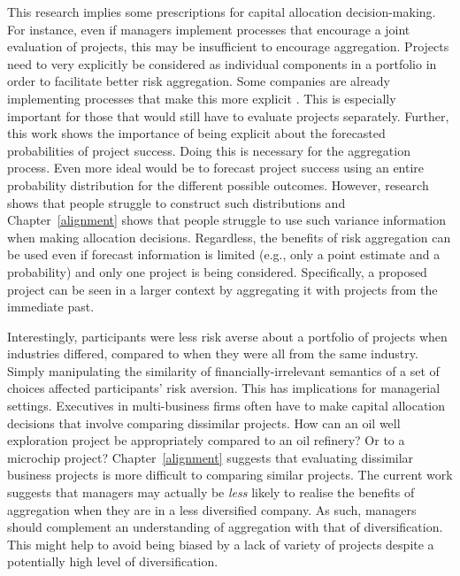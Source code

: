 \documentclass[a4paper, nobind, dvipsnames]{templates/ociamthesis}
\theoremstyle{definition}
\theoremstyle{definition}
\theoremstyle{definition}
\theoremstyle{definition}
\theoremstyle{remark}
\begin{document}
This research implies some prescriptions for capital allocation decision-making.
For instance, even if managers implement processes that encourage a joint
evaluation of projects, this may be insufficient to encourage aggregation.
Projects need to very explicitly be considered as individual components in a
portfolio in order to facilitate better risk aggregation. Some companies are
already implementing processes that make this more explicit \autocite{lovallo2020}. This
is especially important for those that would still have to evaluate projects
separately. Further, this work shows the importance of being explicit about the
forecasted probabilities of project success. Doing this is necessary for the
aggregation process. Even more ideal would be to forecast project success using
an entire probability distribution for the different possible outcomes. However,
research shows that people struggle to construct such distributions \autocites[e.g.,][]{alpert1982,schaefer1973,staelvonholstein1971,tversky1974} and
Chapter~\ref{alignment} shows that people struggle to use such variance
information when making allocation decisions. Regardless, the benefits of risk
aggregation can be used even if forecast information is limited (e.g., only a
point estimate and a probability) and only one project is being considered.
Specifically, a proposed project can be seen in a larger context by aggregating
it with projects from the immediate past.

Interestingly, participants were less risk averse about a portfolio of projects
when industries differed, compared to when they were all from the same industry.
Simply manipulating the similarity of financially-irrelevant semantics of a set
of choices affected participants' risk aversion. This has implications for
managerial settings. Executives in multi-business firms often have to make
capital allocation decisions that involve comparing dissimilar projects. How can
an oil well exploration project be appropriately compared to an oil refinery? Or
to a microchip project? Chapter~\ref{alignment} suggests that evaluating
dissimilar business projects is more difficult to comparing similar projects.
The current work suggests that managers may actually be \emph{less} likely to realise
the benefits of aggregation when they are in a less diversified company. As
such, managers should complement an understanding of aggregation with that of
diversification. This might help to avoid being biased by a lack of variety of
projects despite a potentially high level of diversification.
\end{document}
